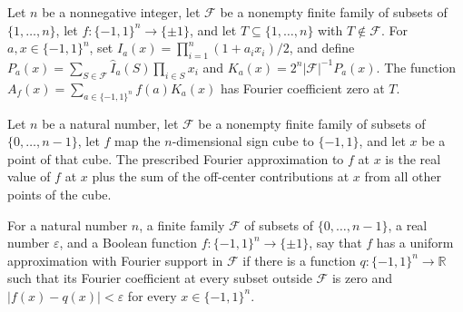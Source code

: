 \begin{theorem}
\label{FABL.fourierCoeff_prescribedFourierApproximation_eq_zero}
\leanok
{}
Let $n$ be a nonnegative integer, let $\mathcal F$ be a nonempty finite family of
subsets of $\{1,\ldots,n\}$, let $f:\{-1,1\}^n\to\{\pm1\}$, and let
$T\subseteq\{1,\ldots,n\}$ with $T\notin\mathcal F$. For $a,x\in\{-1,1\}^n$,
set $I_a(x)=\prod_{i=1}^n(1+a_ix_i)/2$, and define $P_a(x)=\sum_{S\in\mathcal
F}\widehat I_a(S)\prod_{i\in S}x_i$ and $K_a(x)=2^n|\mathcal F|^{-1}P_a(x)$. The
function $A_f(x)=\sum_{a\in\{-1,1\}^n}f(a)K_a(x)$ has Fourier coefficient zero at
$T$.
\end{theorem}

\begin{theorem}
\label{FABL.prescribedFourierApproximation_apply}
\leanok
{}
Let $n$ be a natural number, let $\mathcal F$ be a nonempty finite family of subsets of
$\{0,\ldots,n-1\}$, let $f$ map the $n$-dimensional sign cube to $\{−1,1\}$, and let $x$
be a point of that cube. The prescribed Fourier approximation to $f$ at $x$ is the real
value of $f$ at $x$ plus the sum of the off-center contributions at $x$ from all other
points of the cube.
\end{theorem}

\begin{definition}
\label{FABL.HasPrescribedFourierUniformApproximation}
\leanok
{}
For a natural number $n$, a finite family $\mathcal F$ of subsets of $\{0,\ldots,n-1\}$,
a real number $\varepsilon$, and a Boolean function $f:\{-1,1\}^n\to\{\pm1\}$, say that
$f$ has a uniform approximation with Fourier support in $\mathcal F$ if there is a
function $q:\{-1,1\}^n\to\mathbb R$ such that its Fourier coefficient at every subset
outside $\mathcal F$ is zero and $|f(x)-q(x)|<\varepsilon$ for every $x\in\{-1,1\}^n$.
\end{definition}

